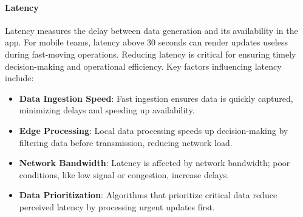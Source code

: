         \paragraph{Latency}
        \label{par:latency}

        Latency measures the delay between data generation and its availability in the app. For mobile teams, latency above 30 seconds can render updates useless during fast-moving operations. Reducing latency is critical for ensuring timely decision-making and operational efficiency. Key factors influencing latency include: \autocite{GeeksforGeeks2024Oct}

        \begin{itemize} 
            \item \textbf{Data Ingestion Speed}: Fast ingestion ensures data is quickly captured, minimizing delays and speeding up availability.
            \item \textbf{Edge Processing}: Local data processing speeds up decision-making by filtering data before transmission, reducing network load.
            \item \textbf{Network Bandwidth}: Latency is affected by network bandwidth; poor conditions, like low signal or congestion, increase delays.
            \item \textbf{Data Prioritization}: Algorithms that prioritize critical data reduce perceived latency by processing urgent updates first.

        \end{itemize}

\blankLine

